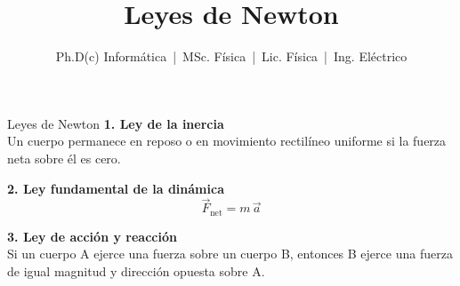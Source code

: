 \documentclass{beamer}
\title{Leyes de Newton}
\author{Ph.D(c) Informática \,|\, MSc. Física \,|\, Lic. Física \,|\, Ing. Eléctrico}
\date{}
\begin{document}
\begin{frame}{Leyes de Newton}
\textbf{1. Ley de la inercia} \\
Un cuerpo permanece en reposo o en movimiento rectilíneo uniforme si la fuerza neta sobre él es cero.

\vspace{0.4cm}
\textbf{2. Ley fundamental de la dinámica} \\
\[
\vec{F}_{\text{net}} = m \, \vec{a}
\]

\vspace{0.4cm}
\textbf{3. Ley de acción y reacción} \\
Si un cuerpo A ejerce una fuerza sobre un cuerpo B, entonces B ejerce una fuerza de igual magnitud y dirección opuesta sobre A.
\end{frame}
\end{document}
